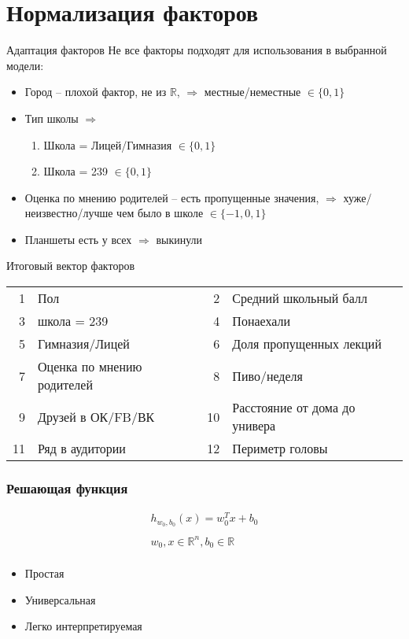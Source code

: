 \documentclass[14pt, fleqn, xcolor={dvipsnames, table}, hyperref={unicode}, babel={english,russian}, inputenc=utf8x]{beamer}
\begin{document}
\section{Нормализация факторов}
\begin{frame}{Адаптация факторов}
Не все факторы подходят для использования в выбранной модели:
\begin{itemize}
  \item Город -- плохой фактор, не из $\mathbb{R}$, $\Rightarrow$ местные/неместные $\in \{0,1\}$
  \item Тип школы $\Rightarrow$
  \begin{enumerate}
    \item Школа = Лицей/Гимназия $\in \{0,1\}$
    \item Школа = 239 $\in \{0,1\}$
  \end{enumerate}
  \item Оценка по мнению родителей -- есть пропущенные значения, $\Rightarrow$ хуже/неизвестно/лучше чем было в школе $\in \{-1,0,1\}$
  \item Планшеты есть у всех $\Rightarrow$ выкинули
\end{itemize}
\end{frame}

\begin{frame}{Итоговый вектор факторов}
\begin{center}
\footnotesize
\begin{tabular}{rlrl}
1 & Пол & 2 & Средний школьный балл \\
3 & школа = 239 & 4 & Понаехали \\
5 & Гимназия/Лицей & 6 & Доля пропущенных лекций \\
7 & Оценка по мнению родителей & 8 & Пиво/неделя \\
9 & Друзей в ОК/FB/ВК & 10 & Расстояние от дома до универа \\
11 & Ряд в аудитории & 12 & Периметр головы
\end{tabular}
\end{center}
\end{frame}

\begin{frame}[t]\frametitle{Решающая функция}
    $$\begin{array}{c}
      h_{w_0,b_0}(x) = w_0^{T}x + b_0 \\
      \\
      w_0, x \in \mathbb{R}^n, b_0 \in \mathbb{R} \\
      \end{array}
    $$
\begin{itemize}
  \item Простая
  \item Универсальная
  \item Легко интерпретируемая
\end{itemize}
\end{frame}
\end{document}
